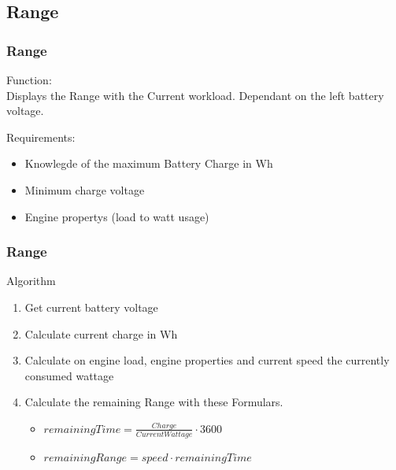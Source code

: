 \documentclass{beamer}
\begin{document}
\subsection{Range}
\begin{frame}
    \frametitle{Range}
    Function:\\
    Displays the Range with the Current workload. Dependant on the left battery voltage.

    Requirements:
    \begin{itemize}
        \item Knowlegde of the maximum Battery Charge in Wh
        \item Minimum charge voltage
        \item Engine propertys (load to watt usage)
    \end{itemize}
    

\end{frame}
\begin{frame}
    \frametitle{Range}
    Algorithm
    \begin{enumerate}
     \item Get current battery voltage
     \item Calculate current charge in Wh
     \item Calculate on engine load, engine properties and current speed the currently consumed wattage
     \item Calculate the remaining Range with these Formulars.
     \begin{itemize}
        \item $remainingTime=\frac{Charge}{Current Wattage}\cdot3600$
        \item $remainingRange=speed\cdot remainingTime$
     \end{itemize}
    \end{enumerate}
\end{frame}
\end{document}
